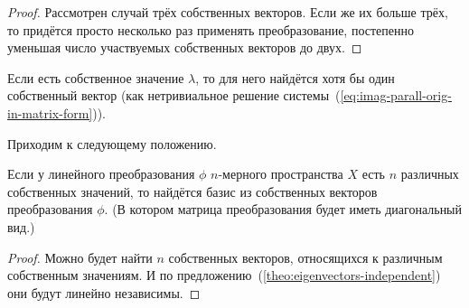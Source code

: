 \documentclass[a4paper,12pt]{article}
\newcommand{\proofindent}{\hspace*{\fill}\par\vspace{0.5em}\noindent}
\begin{document}
\begin{proof}
    Рассмотрен случай трёх собственных векторов.
    Если же их больше трёх, то придётся просто несколько раз применять преобразование, постепенно уменьшая число участвуемых собственных векторов до двух.
  \end{proof}
  
  Если есть собственное значение $\lambda$, то для него найдётся хотя бы один собственный вектор (как нетривиальное решение системы~(\ref{eq:imag-parall-orig-in-matrix-form})).
  
  Приходим к следующему положению.
  
  \begin{theorem}\label{theo:sufficient-condition-for-diag}
    \proofindent
    Если у линейного преобразования $\phi$ $n$-мерного пространства $X$ есть $n$ различных собственных значений, то найдётся базис из собственных векторов преобразования $\phi$.
    (В котором матрица преобразования будет иметь диагональный вид.)
  \end{theorem}
  
  \begin{proof}
    Можно будет найти $n$ собственных векторов, относящихся к различным собственным значениям.
    И по предложению~(\ref{theo:eigenvectors-independent}) они будут линейно независимы.
  \end{proof}
  
\end{document}
